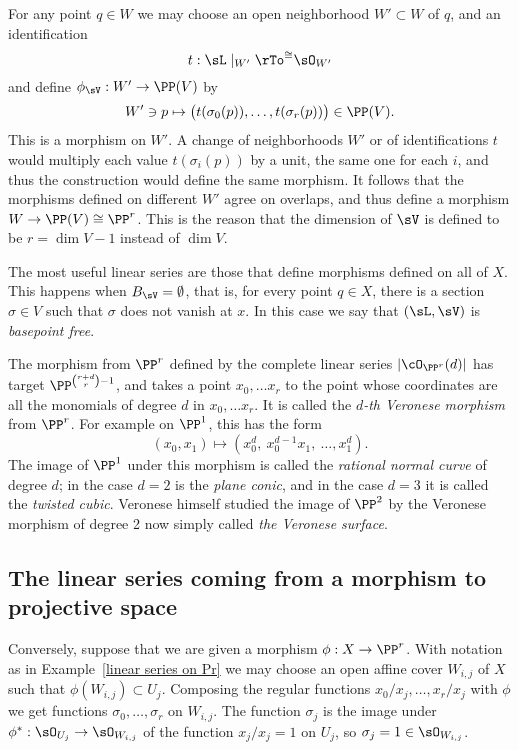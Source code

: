 For any point $q\in W$ we  may choose an open neighborhood $W'\subset W$ of $q$, and an identification 
$$
t: \sL\mid_{W'} \rTo^{\cong} \sO_{W'}
$$
and define $\phi_{\sV}: W' \to \PP(V)$ by 
$$
W'\ni p \mapsto \bigl(t(\sigma_{0}(p)),\dots, t(\sigma_{r}(p))\bigr) \in \PP(V).
$$
This  is a morphism on $W'$. A change of neighborhoods $W'$ or of identifications $t$ would multiply
each value $t(\sigma_{i}(p))$ by a unit, the same one for each $i$, and thus the construction would define the same morphism. It follows that the morphisms
defined on different $W'$ agree on overlaps, and thus define a morphism $W \to \PP(V) \cong \PP^r$. This is the reason
that the dimension of $\sV$ is defined to be $r=\dim V -1$ instead of $\dim V$.

The most useful linear series are those that define morphisms defined on all of $X$. This happens when $B_\sV = \emptyset$,
that is, for every point $q\in X$, there is a section $\sigma \in V$ such that $\sigma$ does not vanish at $x$. In this case we say that $(\sL, \sV)$ is \emph{basepoint free}.

\begin{example}\label{Veronese definition}
The morphism from $\PP^r$ defined by the complete linear series $|\cO_{\PP^r}(d)|$ has target
$\PP^{{r+d\choose r}-1}$, and takes a point $x_0,\dots x_r$ to the point whose coordinates are all the monomials of
degree $d$ in $x_0,\dots x_r$. It is called the \emph{$d$-th Veronese morphism} from $\PP^r$. For example on $\PP^1$, this has the form
$$
(x_0,x_1) \mapsto (x_0^d,\ x_0^{d-1}x_1,\ \dots,x_1^d).
$$
The image of $\PP^1$ under this morphism is called the \emph{rational normal curve} of degree $d$; in the case $d=2$ is the
\emph{plane conic}, and in the case $d=3$ it is called the \emph{twisted cubic}. Veronese himself studied the image of $\PP^2$
by the Veronese morphism of degree 2 now simply called \emph{the Veronese surface}.
\end{example}


\subsection{The linear series coming from a morphism to projective space}\label{series from morphism}

Conversely, suppose that we are given a morphism $\phi: X\to \PP^{r}$. With notation as in Example~\ref{linear series on Pr} we may choose an open affine cover $W_{i,j}$ of $X$ such that $\phi(W_{i,j})\subset U_{j}$. Composing the regular
functions
$x_{0}/x_{j},\dots, x_{r}/x_{j}$ with $\phi$ we get functions $\sigma_{0},\dots,\sigma_{r}$ on $W_{i,j}$.  The function $\sigma_{j}$ is the image under $\phi^*: \sO_{U_j} \to \sO_{W_{i,j}}$ of the function $x_j/x_j = 1$ on $U_{j}$, so $\sigma_j = 1\in \sO_{W_{i,j}}$. 

